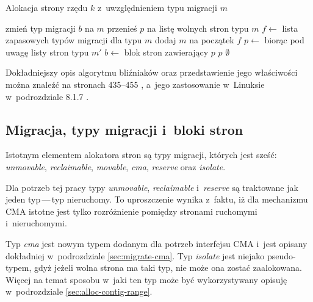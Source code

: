 \begin{algorithm}
\caption[Alokacja z~uwzględnieniem typu migracji.]{Alokacja strony
  rzędu $k$ z~uwzględnieniem typu migracji $m$}
\label{alg:buddy-fallback}
\begin{algorithmic}[1]
\State zmień typ migracji $b$ na $m$
    \State przenieś $p$ na listę wolnych stron typu $m$
\EndFor
\EndFunction
\Statex
{}
    \State $f \gets$ lista zapasowych typów migracji dla typu $m$
    \State dodaj $m$ na początek $f$
        \State $p \gets$  biorąc pod uwagę listy stron typu $m'$
                \State $b \gets$ blok stron zawierający $p$
                \State {}
            \EndIf
            \State \Return $p$
        \EndIf
    \EndFor
    \State \Return $\emptyset$
\EndFunction
\end{algorithmic}
\end{algorithm}
Dokładniejszy opis algorytmu bliźniaków oraz przedstawienie jego
właściwości można znaleźć na stronach 435--455
\autocite{bib:taocp-fa}, a~jego zastosowanie w~Linuksie w~podrozdziale
8.1.7 \autocite{bib:utlk}.


\subsection{Migracja, typy migracji i~bloki stron}\label{sec:migratetype}

Istotnym elementem alokatora stron są typy migracji, których jest
sześć: \textit{unmovable}, \textit{reclaimable}, \textit{movable},
\textit{cma}, \textit{reserve} oraz \textit{isolate}.

Dla potrzeb tej pracy typy \textit{unmovable}, \textit{reclaimable}
i~{\it reserve} są traktowane jak jeden typ\,---\,typ nieruchomy.  To
uproszczenie wynika z~faktu, iż dla mechanizmu CMA istotne jest tylko
rozróżnienie pomiędzy stronami ruchomymi i~nieruchomymi.

Typ \textit{cma} jest nowym typem dodanym dla potrzeb interfejsu CMA
i~jest opisany dokładniej w~podrozdziale \ref{sec:migrate-cma}.  Typ
\textit{isolate} jest niejako pseudo-typem, gdyż jeżeli wolna strona
ma taki typ, nie może ona zostać zaalokowana.  Więcej na temat sposobu
w~jaki ten typ może być wykorzystywany opisuję w~podrozdziale
\ref{sec:alloc-contig-range}.

